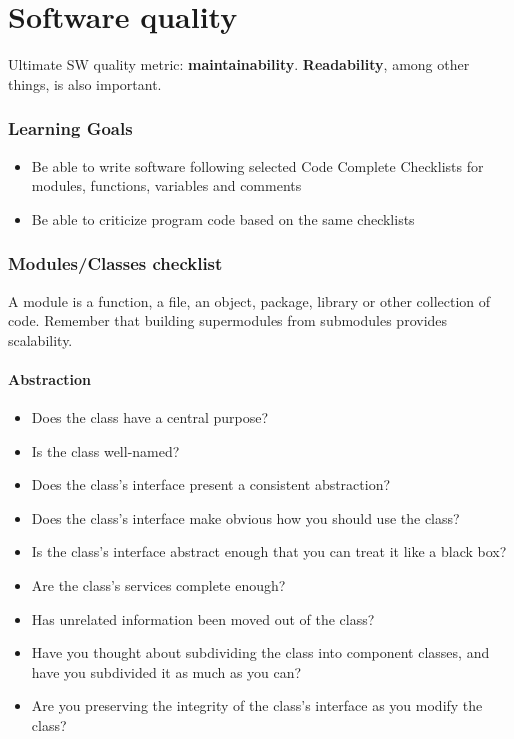 \part{Software quality}
Ultimate SW quality metric: \textbf{maintainability}. \textbf{Readability}, among other things, is also important.
\section{Learning Goals}
\begin{itemize}
\item Be able to write software following selected Code Complete Checklists for modules, functions, variables and comments
\item Be able to criticize program code based on the same checklists

\end{itemize}

\section{Modules/Classes checklist}
A module is a function, a file, an object, package, library or other collection of code. Remember that building supermodules from submodules provides scalability. 
\subsection{Abstraction}
\begin{itemize}
\item Does the class have a central purpose?
\item Is the class well-named?
\item Does the class's interface present a consistent abstraction?
\item Does the class's interface make obvious how you should use the class?
\item Is the class's interface abstract enough that you can treat it like a black box?
\item Are the class's services complete enough? 
\item Has unrelated information been moved out of the class? 
\item Have you thought about subdividing the class into component classes, and have you subdivided it as much as you can?
\item Are you preserving the integrity of the class’s interface as you modify the class?
\end{itemize}

